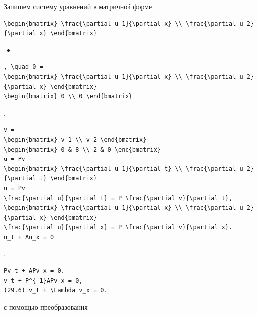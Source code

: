 \documentclass[
  ukrainian,
]{article}
\providecommand{\tightlist}{%
  \setlength{\itemsep}{0pt}\setlength{\parskip}{0pt}}
\begin{document}
Запишем систему уравнений в матричной форме

\begin{verbatim}
\begin{bmatrix} \frac{\partial u_1}{\partial x} \\ \frac{\partial u_2}{\partial x} \end{bmatrix}
\end{verbatim}

\begin{itemize}
\tightlist
\item
\end{itemize}

\begin{verbatim}
, \quad 0 =
\begin{bmatrix} \frac{\partial u_1}{\partial x} \\ \frac{\partial u_2}{\partial x} \end{bmatrix}
\begin{bmatrix} 0 \\ 0 \end{bmatrix}
\end{verbatim}

.

\begin{verbatim}
v =
\begin{bmatrix} v_1 \\ v_2 \end{bmatrix}
\begin{bmatrix} 0 & 8 \\ 2 & 0 \end{bmatrix}
u = Pv
\begin{bmatrix} \frac{\partial u_1}{\partial t} \\ \frac{\partial u_2}{\partial t} \end{bmatrix}
u = Pv
\frac{\partial u}{\partial t} = P \frac{\partial v}{\partial t},
\begin{bmatrix} \frac{\partial u_1}{\partial x} \\ \frac{\partial u_2}{\partial x} \end{bmatrix}
\frac{\partial u}{\partial x} = P \frac{\partial v}{\partial x}.
u_t + Au_x = 0
\end{verbatim}

.

\begin{verbatim}
Pv_t + APv_x = 0.
v_t + P^{-1}APv_x = 0,
(29.6) v_t + \Lambda v_x = 0.
\end{verbatim}

с помощью преобразования
\end{document}
